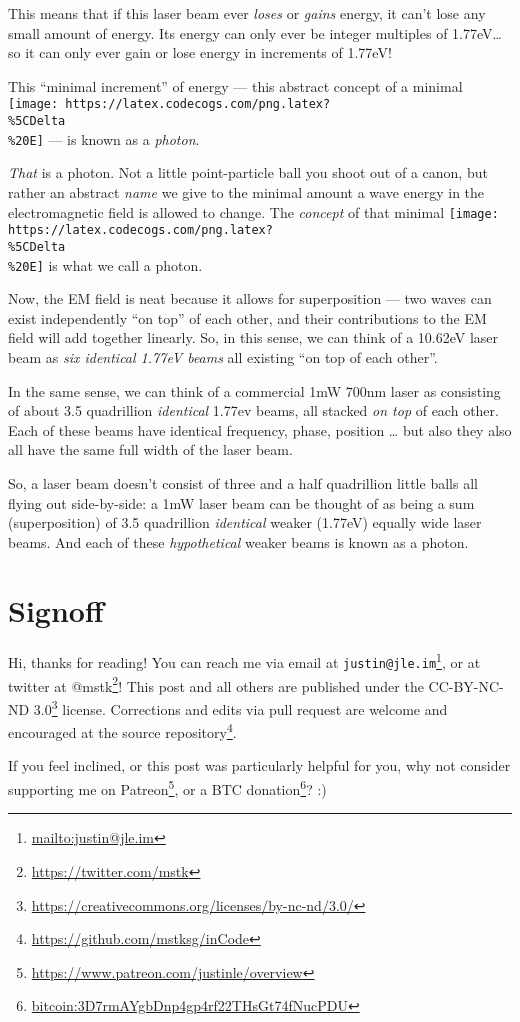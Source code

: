 \documentclass[]{article}
\renewcommand{\href}[2]{#2\footnote{\url{#1}}}
\begin{document}
This means that if this laser beam ever \emph{loses} or \emph{gains} energy, it
can't lose any small amount of energy. Its energy can only ever be integer
multiples of 1.77eV\ldots so it can only ever gain or lose energy in increments
of 1.77eV!

This ``minimal increment'' of energy --- this abstract concept of a minimal
\texttt{[image: https://latex.codecogs.com/png.latex?\\\%5CDelta\\\%20E]} --- is
known as a \emph{photon}.

\emph{That} is a photon. Not a little point-particle ball you shoot out of a
canon, but rather an abstract \emph{name} we give to the minimal amount a wave
energy in the electromagnetic field is allowed to change. The \emph{concept} of
that minimal
\texttt{[image: https://latex.codecogs.com/png.latex?\\\%5CDelta\\\%20E]} is what we
call a photon.

Now, the EM field is neat because it allows for superposition --- two waves can
exist independently ``on top'' of each other, and their contributions to the EM
field will add together linearly. So, in this sense, we can think of a 10.62eV
laser beam as \emph{six identical 1.77eV beams} all existing ``on top of each
other''.

In the same sense, we can think of a commercial 1mW 700nm laser as consisting of
about 3.5 quadrillion \emph{identical} 1.77ev beams, all stacked \emph{on top}
of each other. Each of these beams have identical frequency, phase, position
\ldots{} but also they also all have the same full width of the laser beam.

So, a laser beam doesn't consist of three and a half quadrillion little balls
all flying out side-by-side: a 1mW laser beam can be thought of as being a sum
(superposition) of 3.5 quadrillion \emph{identical} weaker (1.77eV) equally wide
laser beams. And each of these \emph{hypothetical} weaker beams is known as a
photon.

\hypertarget{signoff}{%
\section{Signoff}\label{signoff}}

Hi, thanks for reading! You can reach me via email at
\href{mailto:justin@jle.im}{\nolinkurl{justin@jle.im}}, or at twitter at
\href{https://twitter.com/mstk}{@mstk}! This post and all others are published
under the \href{https://creativecommons.org/licenses/by-nc-nd/3.0/}{CC-BY-NC-ND
3.0} license. Corrections and edits via pull request are welcome and encouraged
at \href{https://github.com/mstksg/inCode}{the source repository}.

If you feel inclined, or this post was particularly helpful for you, why not
consider \href{https://www.patreon.com/justinle/overview}{supporting me on
Patreon}, or a \href{bitcoin:3D7rmAYgbDnp4gp4rf22THsGt74fNucPDU}{BTC donation}?
:)
\end{document}
